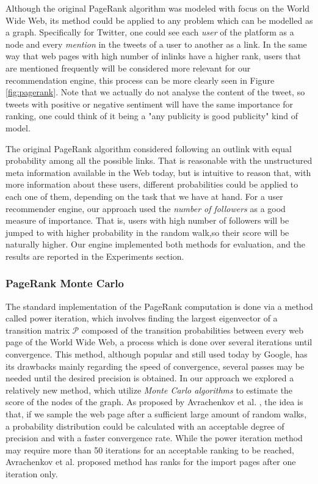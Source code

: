 Although the original PageRank algorithm was modeled with focus on the World
Wide Web, its method could be applied to any problem which can be modelled as a
graph. Specifically for Twitter, one could see each \emph{user} of the platform
as a node and every \emph{mention} in the tweets of a user to another as a link.
In the same way that web pages with high number of inlinks have a higher rank,
users that are mentioned frequently will be considered more relevant for our
recommendation engine, this process can be more clearly seen in Figure
\ref{fig:pagerank}. Note that we actually do not analyse the content of the
tweet, so tweets with positive or negative sentiment will have the same
importance for ranking, one could think of it being a "any publicity is good
publicity" kind of model.

The original PageRank algorithm considered following an outlink with equal
probability among all the possible links. That is reasonable with the
unstructured meta information available in the Web today, but is intuitive to
reason that, with more information about these users, different probabilities
could be applied to each one of them, depending on the task that we have at
hand. For a user recommender engine, our approach used the \emph{number of
followers} as a good measure of importance. That is, users with high number of
followers will be jumped to with higher probability in the random walk,so their
score will be naturally higher. Our engine implemented both methods for
evaluation, and the results are reported in the Experiments section.

\subsubsection{PageRank Monte Carlo}

The standard implementation of the PageRank computation is done via a method
called power iteration, which involves finding the largest eigenvector of a
transition matrix $\mathcal{P}$ composed of the transition probabilities between
every web page of the World Wide Web, a process which is done over several
iterations until convergence. This method, although popular and still used today
by Google, has its drawbacks mainly regarding the speed of convergence, several
passes may be needed until the desired precision is obtained. In our approach we
explored a relatively new method, which utilize \emph{Monte Carlo algorithms} to
estimate the score of the nodes of the graph. As proposed by Avrachenkov et al.
\cite{prmc}, the idea is that, if we sample the web page after a sufficient
large amount of random walks, a probability distribution could be calculated
with an acceptable degree of precision and with a faster convergence rate. While
the power iteration method may require more than 50 iterations for an acceptable
ranking to be reached, Avrachenkov et al. proposed method has ranks for the
import pages after one iteration only.

